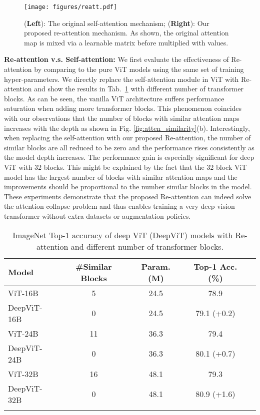 \documentclass[10pt,twocolumn,letterpaper]{article}
\newcommand{\nameofatten}{Re-attention}
\newcommand{\myPara}[1]{\vspace{.05in}\noindent\textbf{#1}}
\begin{document}
\begin{figure}[t]
    \centering
    \texttt{[image: figures/reatt.pdf]}
    \caption{(\textbf{Left}): The original self-attention mechanism; (\textbf{Right}): Our proposed re-attention mechanism. As shown, the original attention map is mixed via a learnable matrix  before multiplied with values.}
    \label{fig              :reatt}
\end{figure}

\myPara{Re-attention v.s. Self-attention:}
We first evaluate the effectiveness of \nameofatten{} by comparing to the pure ViT models
using the same set of training hyper-parameters.
We directly replace the self-attention module in ViT with \nameofatten{} and show the results
in Tab.~\ref{tab:head_regen} with different number of transformer blocks.
As can be seen, the vanilla ViT architecture suffers   performance saturation
when adding more transformer blocks. 
This phenomenon coincides with our observations that the number of blocks with similar attention maps increases with the depth as shown in Fig. \ref{fig:atten_similarity}(b). 
Interestingly, when replacing the   self-attention with
our proposed \nameofatten{}, the number of similar blocks are all reduced to be zero and the performance rises consistently
as the model depth increases.
The performance gain is especially significant for deep ViT with 32 blocks. This might be explained by the fact that the 32 block ViT model has the largest number of blocks with similar attention maps and the improvements should be proportional to the number similar blocks in the model.
These experiments demonstrate that the proposed \nameofatten{}
can indeed solve the attention collapse problem
and thus enables training a very deep vision transformer without extra datasets or augmentation policies.

\begin{table}[h]
\footnotesize
\caption{ImageNet Top-1 accuracy of deep ViT (DeepViT) models with \nameofatten{} and different number of transformer blocks. }
\label{tab:head_regen}
\centering
\begin{tabular}{lcccc}
\toprule
\bf Model
&\bf \#Similar Blocks
&\bf Param. (M)
&\bf Top-1 Acc. (\%)
\\ \midrule ViT-16B \cite{dosovitskiy2020image} & 5 & 24.5 & 78.9 \\
 DeepViT-16B & 0  & 24.5 & 79.1 (+0.2) \\ 
\midrule
 ViT-24B \cite{dosovitskiy2020image} & 11 & 36.3 & 79.4 \\
 DeepViT-24B & 0  & 36.3 & 80.1 (+0.7) \\ 
 \midrule
 ViT-32B \cite{dosovitskiy2020image} & 16 & 48.1 & 79.3 \\
 DeepViT-32B & 0  & 48.1 & 80.9 (+1.6) \\ 
\bottomrule
\vspace{-5mm}
\end{tabular}
\end{table}
\end{document}
